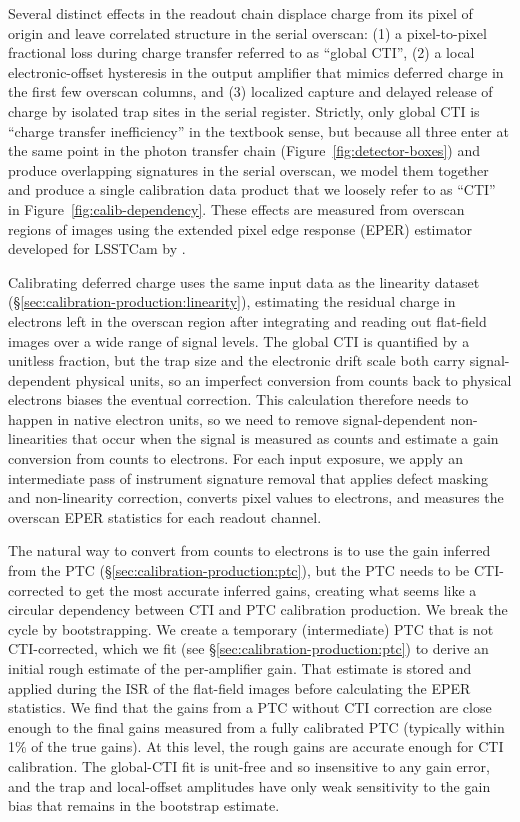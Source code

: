 Several distinct effects in the readout chain displace charge from its pixel of origin and leave correlated structure in the serial overscan: (1) a pixel-to-pixel fractional loss during charge transfer referred to as ``global CTI'', (2) a local electronic-offset hysteresis in the output amplifier that mimics deferred charge in the first few overscan columns, and (3) localized capture and delayed release of charge by isolated trap sites in the serial register.
Strictly, only global CTI is ``charge transfer inefficiency'' in the textbook sense, but because all three enter at the same point in the photon transfer chain (Figure~\ref{fig:detector-boxes}) and produce overlapping signatures in the serial overscan, we model them together and produce a single calibration data product that we loosely refer to as ``CTI'' in Figure~\ref{fig:calib-dependency}.
These effects are measured from overscan regions of images using the extended pixel edge response (EPER) estimator developed for LSSTCam by \citet{2021JATIS...7d48002S}.

Calibrating deferred charge uses the same input data as the linearity dataset (\S\ref{sec:calibration-production:linearity}), estimating the residual charge in electrons left in the overscan region after integrating and reading out flat-field images over a wide range of signal levels.
The global CTI is quantified by a unitless fraction, but the trap size and the electronic drift scale both carry signal-dependent physical units, so an imperfect conversion from counts back to physical electrons biases the eventual correction.
This calculation therefore needs to happen in native electron units, so we need to remove signal-dependent non-linearities that occur when the signal is measured as counts and estimate a gain conversion from counts to electrons.
For each input exposure, we apply an intermediate pass of instrument signature removal that applies defect masking and non-linearity correction, converts pixel values to electrons, and measures the overscan EPER statistics for each readout channel.

The natural way to convert from counts to electrons is to use the gain inferred from the PTC (\S\ref{sec:calibration-production:ptc}), but the PTC needs to be CTI-corrected to get the most accurate inferred gains, creating what seems like a circular dependency between CTI and PTC calibration production.
We break the cycle by bootstrapping. We create a temporary (intermediate) PTC that is not CTI-corrected, which we fit (see \S\ref{sec:calibration-production:ptc}) to derive an initial rough estimate of the per-amplifier gain.
That estimate is stored and applied during the ISR of the flat-field images before calculating the EPER statistics.
We find that the gains from a PTC without CTI correction are close enough to the final gains measured from a fully calibrated PTC (typically within 1\% of the true gains).
At this level, the rough gains are accurate enough for CTI calibration. The global-CTI fit is unit-free and so insensitive to any gain error, and the trap and local-offset amplitudes have only weak sensitivity to the gain bias that remains in the bootstrap estimate.

